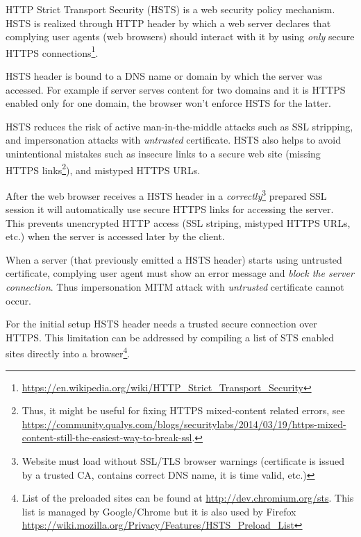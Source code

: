 HTTP Strict Transport Security (HSTS) is a web security policy mechanism. HSTS is realized through HTTP header by which a web server declares that complying user agents (web browsers) should interact with it by using \emph{only} secure HTTPS connections\footnote{\url{https://en.wikipedia.org/wiki/HTTP_Strict_Transport_Security}}. 

HSTS header is bound to a DNS name or domain by which the server was accessed. For example if server serves content for two domains and it is HTTPS enabled only for one domain, the browser won't enforce HSTS for the latter. 

HSTS reduces the risk of active man-in-the-middle attacks such as SSL stripping, and impersonation attacks with \emph{untrusted} certificate. HSTS also helps to avoid unintentional mistakes such as insecure links to a secure web site (missing HTTPS links\footnote{Thus, it might be useful for fixing HTTPS mixed-content related errors, see \url{https://community.qualys.com/blogs/securitylabs/2014/03/19/https-mixed-content-still-the-easiest-way-to-break-ssl}.}), and mistyped HTTPS URLs.  

After the web browser receives a HSTS header in a \emph{correctly}\footnote{Website must load without SSL/TLS browser warnings (certificate is issued by a trusted CA, contains correct DNS name, it is time valid, etc.)} prepared SSL session it will automatically use secure HTTPS links for accessing the server. This prevents unencrypted HTTP access (SSL striping, mistyped HTTPS URLs, etc.) when the server is accessed later by the client. 

When a server (that previously emitted a HSTS header) starts using untrusted certificate, complying user agent must show an error message and \emph{block the server connection}. Thus impersonation MITM attack with \emph{untrusted} certificate cannot occur.

For the initial setup HSTS header needs a trusted secure connection over HTTPS. This limitation can be addressed by compiling a list of STS enabled sites  directly into a browser\footnote{List of the preloaded sites can be found at \url{http://dev.chromium.org/sts}. This list is managed by Google/Chrome but it is also used by Firefox \url{https://wiki.mozilla.org/Privacy/Features/HSTS_Preload_List}}. 

